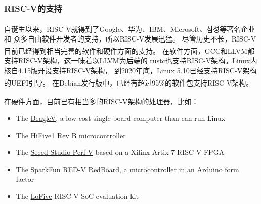 \documentclass[UTF8,fontset=none,linespread=1.15]{ctexart}
\let\nosupcite\cite
\renewcommand*{\cite}[1]{\textsuperscript{\nosupcite{#1}}}
\begin{document}
\subsubsection{RISC-V的支持}
自诞生以来，RISC-V就得到了Google、华为、IBM、Microsoft、삼성等著名企业\cite{bib:risc-v-manual}和
众多自由软件开发者的支持，所以RISC-V发展迅猛。
尽管历史不长，RISC-V目前已经得到相当完善的软件和硬件方面的支持。
在软件方面，GCC\cite{bib:riscv-gcc}和LLVM\cite{bib:riscv-llvm}都
支持RISC-V架构，这一味着以LLVM为后端的
rustc也支持RISC-V架构。Linux内核自4.15版开设支持RISC-V架构，
到2020年底，Linux 5.10已经支持RISC-V架构的UEFI引导。\cite{bib:riscv-linux}
在Debian发行版中，已经有超过95\%的软件包支持RISC-V架构。\cite{bib:riscv-debian}

在硬件方面，目前已有相当多的RISC-V架构的处理器，比如：\cite{bib:riscv-support}
\begin{itemize}
\item The \href{https://beagleboard.org/beaglev}{BeagleV}, a low-cost single board computer than can run Linux
\item The \href{https://www.sifive.com/boards/hifive1-rev-b}{HiFive1 Rev B} microcontroller
\item The \href{https://www.seeedstudio.com/Perf-V-Based-on-Xilinx-Artix-7-FPGA-RISC-V-opensource-p-4058.html}{Seeed Studio Perf-V} based on a Xilinx Artix-7 RISC-V FPGA
\item The \href{https://www.sparkfun.com/products/15594}{SparkFun RED-V RedBoard}, a microcontroller in an Arduino form factor
\item The \href{https://www.digikey.ca/en/products/detail/groupgets-llc/LOFIVE-R1/10186935}{LoFive} RISC-V SoC evaluation kit
\end{itemize}
\end{document}
